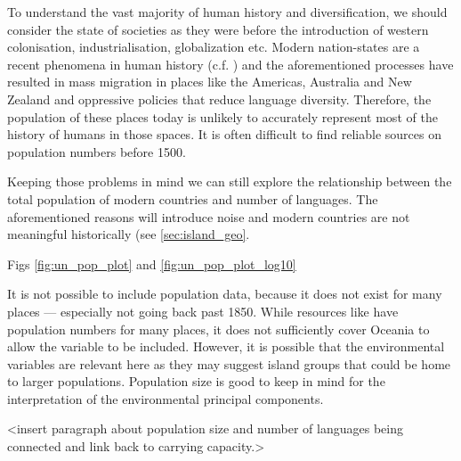 \documentclass[a4paper,10pt]{article} %
\begin{document}
To understand the vast majority of human history and diversification, we should consider the state of societies as they were before the introduction of western colonisation, industrialisation, globalization etc. Modern nation-states are a recent phenomena in human history (c.f. \citet{foucault2007security}) and the aforementioned processes have resulted in mass migration in places like the Americas, Australia and New Zealand and oppressive policies that reduce language diversity. Therefore, the population of these places today is unlikely to accurately represent most of the history of humans in those spaces. It is often difficult to find reliable sources on population numbers before 1500.

Keeping those problems in mind we can still explore the relationship between the total population of modern countries and number of languages. The aforementioned reasons will introduce noise and modern countries are not meaningful historically (see \ref{sec:island_geo}. 


Figs \ref{fig:un_pop_plot} and \ref{fig:un_pop_plot_log10}



It is not possible to include population data, because it does not exist for many places --- especially not going back past 1850. While resources like \citet{elcat} have population numbers for many places, it does not sufficiently cover Oceania to allow the variable to be included. However, it is possible that the environmental variables are relevant here as they may suggest island groups that could be home to larger populations. Population size is good to keep in mind for the interpretation of the environmental principal components. 



<insert paragraph about population size and number of languages being connected and link back to carrying capacity.>

\citet{UN_pop}
\end{document}
